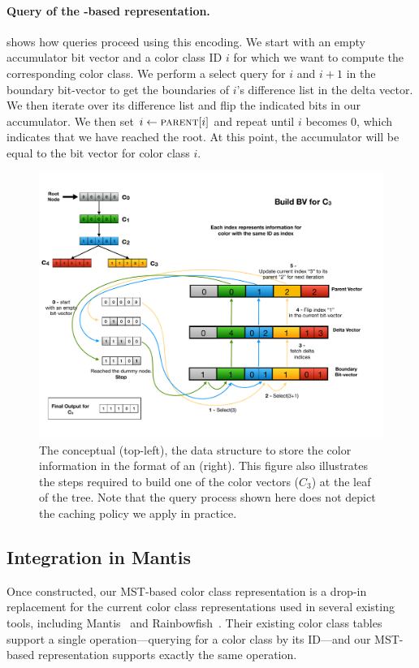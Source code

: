 \paragraph{Query of the \mst-based representation.}  shows how queries proceed using this encoding.
We start with an empty accumulator bit vector and a color class ID $i$
for which we want to compute the corresponding color class.  We
perform a select query for $i$ and $i+1$ in the boundary bit-vector to get the
boundaries of $i$'s difference list in the delta vector.  We then
iterate over its difference list and flip the indicated bits in our
accumulator.  We then set $i\gets \textsc{parent}[i]$ and repeat
until $i$ becomes 0, which indicates that we have reached the root.
At this point, the accumulator will be equal to the bit vector for
color class $i$.

\begin{figure}[t!]
    \centering
    \includegraphics[width=0.65\columnwidth]{figs/mantis/figure2}
    \caption{The conceptual \mst (top-left), the data structure to
    store the color information in the format of an \mst (right).
    This figure also illustrates the steps required to build one of the color vectors ($C_3$) at the leaf
    of the tree. Note that the query process shown here does not depict the caching policy we apply in practice.}
    \label{fig:query}
    \vspace{-1.5em}
\end{figure}


\subsection{Integration in Mantis}

Once constructed, our MST-based color class representation is a
drop-in replacement for the current color class representations used in
several existing tools, including Mantis~\cite{mantis} and
Rainbowfish~\cite{rainbowfish}.  Their existing color class
tables support a single operation---querying for a color class
by its ID---and our MST-based representation supports exactly
the same operation.

